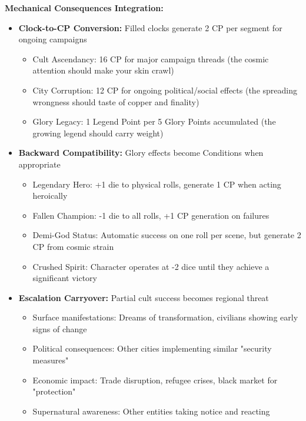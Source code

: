 \documentclass[11pt]{article}
\begin{document}
\begin{itemize}
\begin{itemize}
\begin{itemize}
\textbf{Mechanical Consequences Integration:}
\begin{itemize}
\item \textbf{Clock-to-CP Conversion:} Filled clocks generate 2 CP per segment for ongoing campaigns
  \begin{itemize}
  \item Cult Ascendancy: 16 CP for major campaign threads (the cosmic attention should make your skin crawl)
  \item City Corruption: 12 CP for ongoing political/social effects (the spreading wrongness should taste of copper and finality)
  \item Glory Legacy: 1 Legend Point per 5 Glory Points accumulated (the growing legend should carry weight)
  \end{itemize}
\item \textbf{Backward Compatibility:} Glory effects become Conditions when appropriate
  \begin{itemize}
  \item Legendary Hero: +1 die to physical rolls, generate 1 CP when acting heroically
  \item Fallen Champion: -1 die to all rolls, +1 CP generation on failures
  \item Demi-God Status: Automatic success on one roll per scene, but generate 2 CP from cosmic strain
  \item Crushed Spirit: Character operates at -2 dice until they achieve a significant victory
  \end{itemize}
\item \textbf{Escalation Carryover:} Partial cult success becomes regional threat
  \begin{itemize}
  \item Surface manifestations: Dreams of transformation, civilians showing early signs of change
  \item Political consequences: Other cities implementing similar "security measures"
  \item Economic impact: Trade disruption, refugee crises, black market for "protection"
  \item Supernatural awareness: Other entities taking notice and reacting
  \end{itemize}
\end{itemize}


\end{itemize}
\end{itemize}
\end{itemize}
\end{document}
